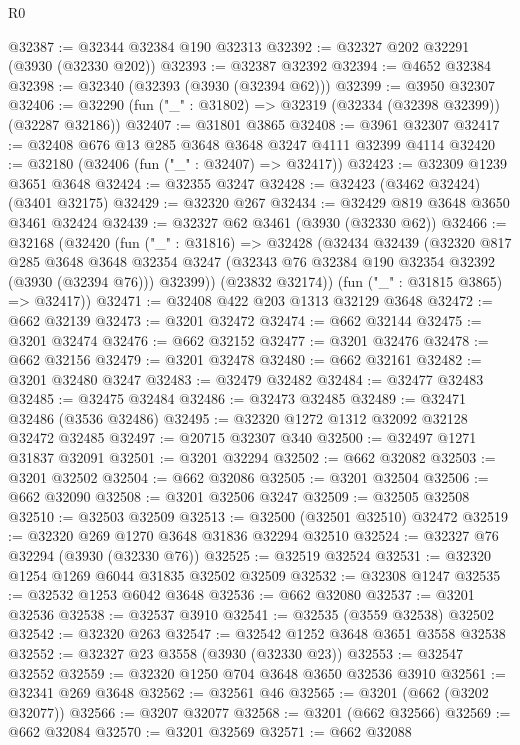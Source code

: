 \begin{lexlean}{R0}
\begin{coremodule}
@32387 := @32344 @32384 @190 @32313
@32392 := @32327 @202 @32291 (@3930 (@32330 @202))
@32393 := @32387 @32392
@32394 := @4652 @32384
@32398 := @32340 (@32393 (@3930 (@32394 @62)))
@32399 := @3950 @32307
@32406 := @32290 (fun ("_" : @31802) => @32319 (@32334 (@32398 @32399)) (@32287 @32186))
@32407 := @31801 @3865
@32408 := @3961 @32307
@32417 := @32408 @676 @13 @285 @3648 @3648 @3247 @4111 @32399 @4114
@32420 := @32180 (@32406 (fun ("_" : @32407) => @32417))
@32423 := @32309 @1239 @3651 @3648
@32424 := @32355 @3247
@32428 := @32423 (@3462 @32424) (@3401 @32175)
@32429 := @32320 @267
@32434 := @32429 @819 @3648 @3650 @3461 @32424
@32439 := @32327 @62 @3461 (@3930 (@32330 @62))
@32466 := @32168
    (@32420
      (fun ("_" : @31816) =>
      @32428
        (@32434
          @32439
          (@32320
            @817
            @285
            @3648
            @3648
            @32354
            @3247
            (@32343 @76 @32384 @190 @32354 @32392 (@3930 (@32394 @76)))
            @32399))
        (@23832 @32174))
      (fun ("_" : @31815 @3865) => @32417))
@32471 := @32408 @422 @203 @1313 @32129 @3648
@32472 := @662 @32139
@32473 := @3201 @32472
@32474 := @662 @32144
@32475 := @3201 @32474
@32476 := @662 @32152
@32477 := @3201 @32476
@32478 := @662 @32156
@32479 := @3201 @32478
@32480 := @662 @32161
@32482 := @3201 @32480 @3247
@32483 := @32479 @32482
@32484 := @32477 @32483
@32485 := @32475 @32484
@32486 := @32473 @32485
@32489 := @32471 @32486 (@3536 @32486)
@32495 := @32320 @1272 @1312 @32092 @32128 @32472 @32485
@32497 := @20715 @32307 @340
@32500 := @32497 @1271 @31837 @32091
@32501 := @3201 @32294
@32502 := @662 @32082
@32503 := @3201 @32502
@32504 := @662 @32086
@32505 := @3201 @32504
@32506 := @662 @32090
@32508 := @3201 @32506 @3247
@32509 := @32505 @32508
@32510 := @32503 @32509
@32513 := @32500 (@32501 @32510) @32472
@32519 := @32320 @269 @1270 @3648 @31836 @32294 @32510
@32524 := @32327 @76 @32294 (@3930 (@32330 @76))
@32525 := @32519 @32524
@32531 := @32320 @1254 @1269 @6044 @31835 @32502 @32509
@32532 := @32308 @1247
@32535 := @32532 @1253 @6042 @3648
@32536 := @662 @32080
@32537 := @3201 @32536
@32538 := @32537 @3910
@32541 := @32535 (@3559 @32538) @32502
@32542 := @32320 @263
@32547 := @32542 @1252 @3648 @3651 @3558 @32538
@32552 := @32327 @23 @3558 (@3930 (@32330 @23))
@32553 := @32547 @32552
@32559 := @32320 @1250 @704 @3648 @3650 @32536 @3910
@32561 := @32341 @269 @3648
@32562 := @32561 @46
@32565 := @3201 (@662 (@3202 @32077))
@32566 := @3207 @32077
@32568 := @3201 (@662 @32566)
@32569 := @662 @32084
@32570 := @3201 @32569
@32571 := @662 @32088

\end{coremodule}
\end{lexlean}
